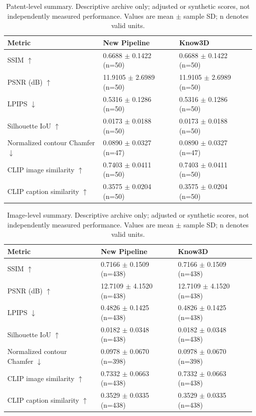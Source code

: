 \begin{table}[t]
\centering
\small
\caption{Patent-level summary. Descriptive archive only; adjusted or synthetic scores, not independently measured performance. Values are mean $\pm$ sample SD; n denotes valid units.}
\begin{tabular}{lll}
\toprule
Metric & New Pipeline & Know3D \\
\midrule
SSIM $\uparrow$ & 0.6688 $\pm$ 0.1422 (n=50) & 0.6688 $\pm$ 0.1422 (n=50) \\
PSNR (dB) $\uparrow$ & 11.9105 $\pm$ 2.6989 (n=50) & 11.9105 $\pm$ 2.6989 (n=50) \\
LPIPS $\downarrow$ & 0.5316 $\pm$ 0.1286 (n=50) & 0.5316 $\pm$ 0.1286 (n=50) \\
Silhouette IoU $\uparrow$ & 0.0173 $\pm$ 0.0188 (n=50) & 0.0173 $\pm$ 0.0188 (n=50) \\
Normalized contour Chamfer $\downarrow$ & 0.0890 $\pm$ 0.0327 (n=47) & 0.0890 $\pm$ 0.0327 (n=47) \\
CLIP image similarity $\uparrow$ & 0.7403 $\pm$ 0.0411 (n=50) & 0.7403 $\pm$ 0.0411 (n=50) \\
CLIP caption similarity $\uparrow$ & 0.3575 $\pm$ 0.0204 (n=50) & 0.3575 $\pm$ 0.0204 (n=50) \\
\bottomrule
\end{tabular}
\end{table}

\begin{table}[t]
\centering
\small
\caption{Image-level summary. Descriptive archive only; adjusted or synthetic scores, not independently measured performance. Values are mean $\pm$ sample SD; n denotes valid units.}
\begin{tabular}{lll}
\toprule
Metric & New Pipeline & Know3D \\
\midrule
SSIM $\uparrow$ & 0.7166 $\pm$ 0.1509 (n=438) & 0.7166 $\pm$ 0.1509 (n=438) \\
PSNR (dB) $\uparrow$ & 12.7109 $\pm$ 4.1520 (n=438) & 12.7109 $\pm$ 4.1520 (n=438) \\
LPIPS $\downarrow$ & 0.4826 $\pm$ 0.1425 (n=438) & 0.4826 $\pm$ 0.1425 (n=438) \\
Silhouette IoU $\uparrow$ & 0.0182 $\pm$ 0.0348 (n=438) & 0.0182 $\pm$ 0.0348 (n=438) \\
Normalized contour Chamfer $\downarrow$ & 0.0978 $\pm$ 0.0670 (n=398) & 0.0978 $\pm$ 0.0670 (n=398) \\
CLIP image similarity $\uparrow$ & 0.7332 $\pm$ 0.0663 (n=438) & 0.7332 $\pm$ 0.0663 (n=438) \\
CLIP caption similarity $\uparrow$ & 0.3529 $\pm$ 0.0335 (n=438) & 0.3529 $\pm$ 0.0335 (n=438) \\
\bottomrule
\end{tabular}
\end{table}

